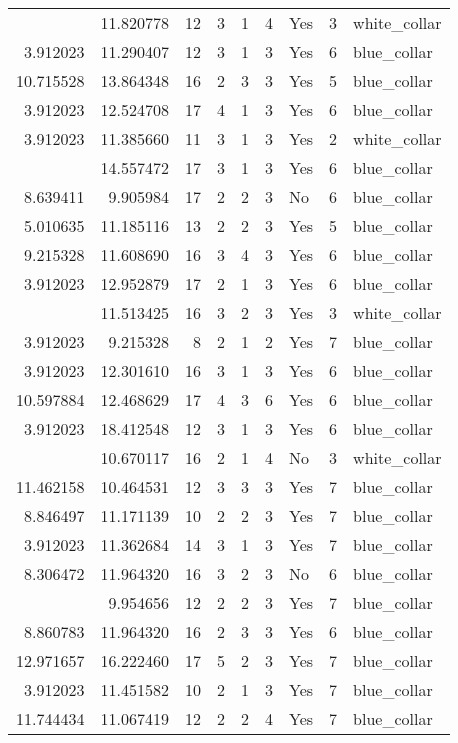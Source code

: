 \documentclass[
]{article}
\begin{document}
\begin{longtable}[t]{rrrrrllrl}
\addlinespace
3.912023 & 11.820778 & 12 & 3 & 1 & 4 & Yes & 3 & white\_collar\\
3.912023 & 11.290407 & 12 & 3 & 1 & 3 & Yes & 6 & blue\_collar\\
10.715528 & 13.864348 & 16 & 2 & 3 & 3 & Yes & 5 & blue\_collar\\
3.912023 & 12.524708 & 17 & 4 & 1 & 3 & Yes & 6 & blue\_collar\\
3.912023 & 11.385660 & 11 & 3 & 1 & 3 & Yes & 2 & white\_collar\\
\addlinespace
3.912023 & 14.557472 & 17 & 3 & 1 & 3 & Yes & 6 & blue\_collar\\
8.639411 & 9.905984 & 17 & 2 & 2 & 3 & No & 6 & blue\_collar\\
5.010635 & 11.185116 & 13 & 2 & 2 & 3 & Yes & 5 & blue\_collar\\
9.215328 & 11.608690 & 16 & 3 & 4 & 3 & Yes & 6 & blue\_collar\\
3.912023 & 12.952879 & 17 & 2 & 1 & 3 & Yes & 6 & blue\_collar\\
\addlinespace
9.215328 & 11.513425 & 16 & 3 & 2 & 3 & Yes & 3 & white\_collar\\
3.912023 & 9.215328 & 8 & 2 & 1 & 2 & Yes & 7 & blue\_collar\\
3.912023 & 12.301610 & 16 & 3 & 1 & 3 & Yes & 6 & blue\_collar\\
10.597884 & 12.468629 & 17 & 4 & 3 & 6 & Yes & 6 & blue\_collar\\
3.912023 & 18.412548 & 12 & 3 & 1 & 3 & Yes & 6 & blue\_collar\\
\addlinespace
3.912023 & 10.670117 & 16 & 2 & 1 & 4 & No & 3 & white\_collar\\
11.462158 & 10.464531 & 12 & 3 & 3 & 3 & Yes & 7 & blue\_collar\\
8.846497 & 11.171139 & 10 & 2 & 2 & 3 & Yes & 7 & blue\_collar\\
3.912023 & 11.362684 & 14 & 3 & 1 & 3 & Yes & 7 & blue\_collar\\
8.306472 & 11.964320 & 16 & 3 & 2 & 3 & No & 6 & blue\_collar\\
\addlinespace
8.707814 & 9.954656 & 12 & 2 & 2 & 3 & Yes & 7 & blue\_collar\\
8.860783 & 11.964320 & 16 & 2 & 3 & 3 & Yes & 6 & blue\_collar\\
12.971657 & 16.222460 & 17 & 5 & 2 & 3 & Yes & 7 & blue\_collar\\
3.912023 & 11.451582 & 10 & 2 & 1 & 3 & Yes & 7 & blue\_collar\\
11.744434 & 11.067419 & 12 & 2 & 2 & 4 & Yes & 7 & blue\_collar\\

\end{longtable}
\end{document}
